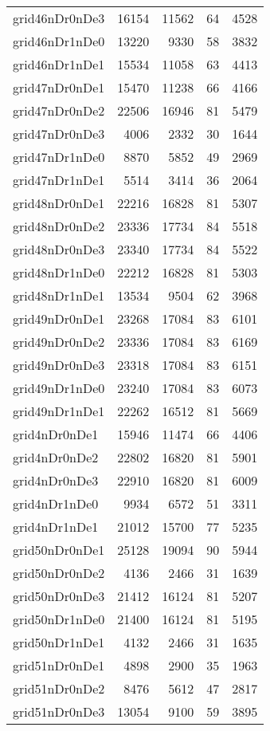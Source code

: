 \begin{longtable}{lrrrr}
grid46nDr0nDe3 & 16154 & 11562 & 64 & 4528 \\
grid46nDr1nDe0 & 13220 & 9330 & 58 & 3832 \\
grid46nDr1nDe1 & 15534 & 11058 & 63 & 4413 \\
grid47nDr0nDe1 & 15470 & 11238 & 66 & 4166 \\
grid47nDr0nDe2 & 22506 & 16946 & 81 & 5479 \\
grid47nDr0nDe3 & 4006 & 2332 & 30 & 1644 \\
grid47nDr1nDe0 & 8870 & 5852 & 49 & 2969 \\
grid47nDr1nDe1 & 5514 & 3414 & 36 & 2064 \\
grid48nDr0nDe1 & 22216 & 16828 & 81 & 5307 \\
grid48nDr0nDe2 & 23336 & 17734 & 84 & 5518 \\
grid48nDr0nDe3 & 23340 & 17734 & 84 & 5522 \\
grid48nDr1nDe0 & 22212 & 16828 & 81 & 5303 \\
grid48nDr1nDe1 & 13534 & 9504 & 62 & 3968 \\
grid49nDr0nDe1 & 23268 & 17084 & 83 & 6101 \\
grid49nDr0nDe2 & 23336 & 17084 & 83 & 6169 \\
grid49nDr0nDe3 & 23318 & 17084 & 83 & 6151 \\
grid49nDr1nDe0 & 23240 & 17084 & 83 & 6073 \\
grid49nDr1nDe1 & 22262 & 16512 & 81 & 5669 \\
grid4nDr0nDe1 & 15946 & 11474 & 66 & 4406 \\
grid4nDr0nDe2 & 22802 & 16820 & 81 & 5901 \\
grid4nDr0nDe3 & 22910 & 16820 & 81 & 6009 \\
grid4nDr1nDe0 & 9934 & 6572 & 51 & 3311 \\
grid4nDr1nDe1 & 21012 & 15700 & 77 & 5235 \\
grid50nDr0nDe1 & 25128 & 19094 & 90 & 5944 \\
grid50nDr0nDe2 & 4136 & 2466 & 31 & 1639 \\
grid50nDr0nDe3 & 21412 & 16124 & 81 & 5207 \\
grid50nDr1nDe0 & 21400 & 16124 & 81 & 5195 \\
grid50nDr1nDe1 & 4132 & 2466 & 31 & 1635 \\
grid51nDr0nDe1 & 4898 & 2900 & 35 & 1963 \\
grid51nDr0nDe2 & 8476 & 5612 & 47 & 2817 \\
grid51nDr0nDe3 & 13054 & 9100 & 59 & 3895 \\

\end{longtable}
